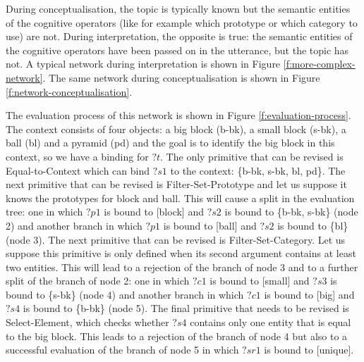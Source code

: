 During conceptualisation, the topic is typically known but the
semantic entities of the cognitive operators (like for example which
prototype or which category to use) are not. During interpretation,
the opposite is true: the semantic entities of the cognitive operators
have been passed on in the utterance, but the topic has not. A typical
network during interpretation is shown in Figure
\ref{f:more-complex-network}. The same network during
conceptualisation is shown in Figure
\ref{f:network-conceptualisation}.

The evaluation process of this network is shown in Figure
\ref{f:evaluation-process}. The context consists of four objects: a
big block (b-bk), a small block (s-bk), a ball (bl) and a pyramid (pd)
and the goal is to identify the big block in this context, so we have
a binding for $?t$. The only primitive that can be revised is {\sc
  Equal-to-Context} which can bind $?s1$ to the context: \{b-bk, s-bk,
bl, pd\}. The next primitive that can be revised is {\sc
  Filter-Set-Prototype} and let us suppose it knows the prototypes for
block and ball. This will cause a split in the evaluation tree: one in
which $?p1$ is bound to [block] and $?s2$ is bound to \{b-bk, s-bk\}
(node 2) and another branch in which $?p1$ is bound to [ball] and
$?s2$ is bound to \{bl\} (node 3). The next primitive that can be
revised is {\sc Filter-Set-Category}. Let us suppose this primitive is
only defined when its second argument contains at least two
entities. This will lead to a rejection of the branch of node 3 and to
a further split of the branch of node 2: one in which $?c1$ is bound
to [small] and $?s3$ is bound to \{s-bk\} (node 4) and another branch
in which $?c1$ is bound to [big] and $?s4$ is bound to \{b-bk\} (node
5). The final primitive that needs to be revised is {\sc
  Select-Element}, which checks whether $?s4$ contains only one entity
that is equal to the big block. This leads to a rejection of the
branch of node 4 but also to a successful evaluation of the branch of
node 5 in which $?sr1$ is bound to [unique].

